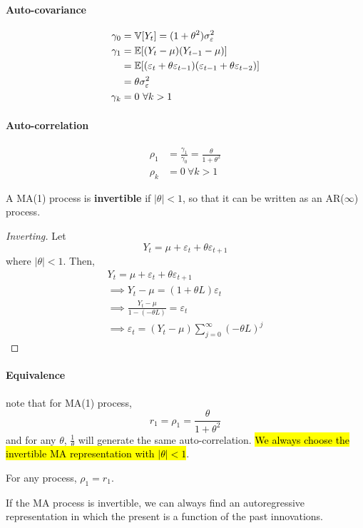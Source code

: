 \documentclass[11pt]{article}
\begin{document}
			\paragraph{Auto-covariance}
				\begin{align}
					\gamma_0 &= \mathbb{V}[{Y_t}] = (1 + \theta^2) \sigma_\varepsilon^2\\
					\gamma_1 &= \mathbb{E}[{(Y_t - \mu) (Y_{t-1} - \mu)}] \\
					&= \mathbb{E}[{(\varepsilon_t + \theta \varepsilon_{t-1})(\varepsilon_{t-1} + \theta \varepsilon_{t-2})}] \\
					&= \theta \sigma_\varepsilon^2 \\
					\gamma_k &= 0\ \forall k > 1
				\end{align}
			\paragraph{Auto-correlation}
				\begin{align}
					\rho_1 &= \frac{\gamma_1}{\gamma_0}
					= \frac{\theta}{1 + \theta^2} \\
					\rho_k &= 0\ \forall k > 1
				\end{align}
				
			\begin{definition}
				A MA(1) process is \textbf{invertible} if $|\theta| < 1$, so that it can be written as an AR($\infty$) process.
			\end{definition}
			\begin{proof}[Inverting]
				Let 
				\begin{equation}
					Y_t = \mu + \varepsilon_t + \theta \varepsilon_{t+1}
				\end{equation}
				where $|\theta| < 1$.
				Then, 
				\begin{gather}
					Y_t = \mu + \varepsilon_t + \theta \varepsilon_{t+1} \\
					\implies Y_t - \mu = (1 + \theta L) \varepsilon_t \\ 
					\implies \frac{Y_t - \mu}{1 - (- \theta L)} = \varepsilon_t \\
					\implies \varepsilon_t = (Y_t - \mu) \sum_{j=0}^\infty (-\theta L)^j
				\end{gather}
			\end{proof}
			
			\paragraph{Equivalence} note that for MA(1) process,
				\begin{equation}
					r_1 = \rho_1 = \frac{\theta}{1 + \theta^2}
				\end{equation}
				and for any $\theta$, $\frac{1}{\theta}$ will generate the same auto-correlation. \hl{We always choose the invertible MA representation with $|\theta| < 1$}.
			\begin{proposition}
				For any process, $\rho_1 = r_1$.
			\end{proposition}
			\begin{remark}
				If the MA process is invertible, we can always find an autoregressive representation in which the present is a function of the past innovations.
			\end{remark}
\end{document}

